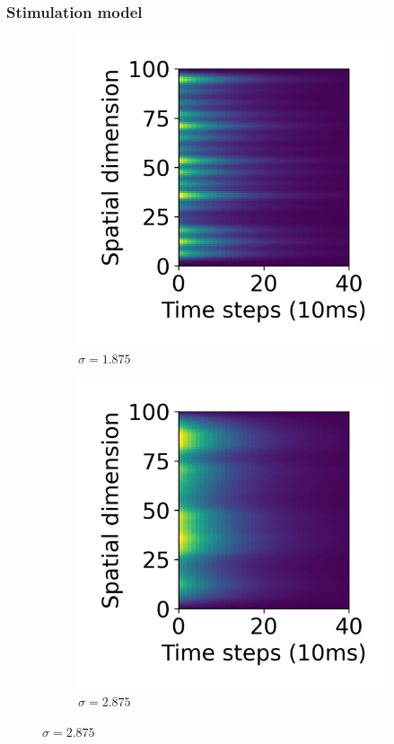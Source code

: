 \documentclass[12pt]{iopart}
\begin{document}
\subsubsection{Stimulation model}

\begin{figure}[h]
	\begin{subfigure}[c]{0.45\textwidth}
		\centering
		\includegraphics[width=\textwidth]{stim_single.png}
		\caption{$\sigma=1.875$}
	\end{subfigure}
	\hfill
	\begin{subfigure}[c]{0.45\textwidth}
		\centering
		\includegraphics[width=\textwidth]{stim_single2.png}
		\caption{$\sigma=2.875$}
	\end{subfigure}


\end{figure}
\end{document}
